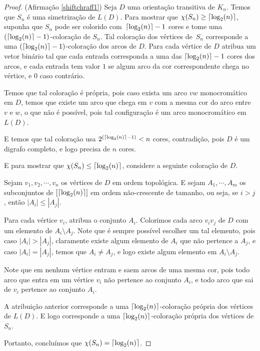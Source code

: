 \begin{proof}(Afirmação \ref{shiftchraff1})
Seja $D$ uma orientação transitiva de $K_n$. Temos que $S_n$ é uma simetrização de $L(D)$. Para mostrar que $\chi(S_n) \geq \lceil\log_2(n)\rceil$, suponha que $S_n$ pode ser colorido com~$\lceil\log_2(n)\rceil - 1$ cores e tome uma $(\lceil\log_2(n)\rceil -1)$-coloração de $S_n$. Tal coloração dos vértices de~$S_n$ corresponde a uma $(\lceil\log_2(n)\rceil-1)$-coloração dos arcos de $D$. Para cada vértice de $D$ atribua um vetor binário tal que cada entrada corresponda a uma das $\lceil\log_2(n)\rceil-1$ cores dos arcos, e cada entrada tem valor $1$ se algum arco da cor correspondente chega no vértice, e $0$ caso contrário. 

Temos que tal coloração é própria, pois caso exista um arco $vw$ monocromático em $D$, temos que existe um arco que chega em $v$ com a mesma cor do arco entre $v$ e $w$, o que não é possível, pois tal configuração é um arco monocromático em $L(D)$. 

E temos que tal coloração usa $2^{(\lceil\log_2(n)\rceil-1)} < n$ cores, contradição, pois $D$ é um digrafo completo, e logo precisa de $n$ cores.

E para mostrar que $\chi(S_n) \leq \lceil\log_2(n)\rceil$, considere a seguinte coloração de $D$.

Sejam $v_1, v_2,\cdots, v_n$ os vértices de $D$ em ordem topológica. E sejam $A_1, \cdots, A_m$ os subconjuntos de $[\lceil\log_2(n)\rceil]$ em ordem não-crescente de tamanho, ou seja, se $i > j$, então $|A_i| \leq |A_j|$.

Para cada vértice $v_i$, atribua o conjunto $A_i$. Colorimos cada arco $v_iv_j$ de $D$ com um elemento de $A_i\setminus A_j$. Note que é sempre possível escolher um tal elemento, pois caso $|A_i| > |A_j|$, claramente existe algum elemento de $A_i$ que não pertence a $A_j$, e caso $|A_i| = |A_j|$, temos que $A_i \neq A_j$, e logo existe algum elemento em $A_i\setminus A_j$.

Note que em nenhum vértice entram e saem arcos de uma mesma cor, pois todo arco que entra em um vértice $v_i$ não pertence ao conjunto $A_i$, e todo arco que sai de $v_i$ pertence ao conjunto $A_i$.

A atribuição anterior corresponde a uma $\lceil\log_2(n)\rceil$-coloração própria dos vértices de $L(D)$. E logo corresponde a uma $\lceil\log_2(n)\rceil$-coloração própria dos vértices de $S_n$.

Portanto, concluímos que $\chi(S_n) = \lceil\log_2(n)\rceil$.
\end{proof}

